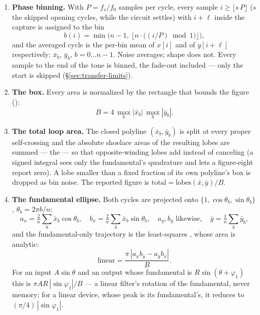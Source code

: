 \documentclass[11pt,a4paper]{article}
\begin{document}
\begin{enumerate}
\item \textbf{Phase binning.} With $P = f_s/f_0$ samples per cycle, every
sample $i \ge \lfloor s\,P \rfloor$ ($s$ the skipped opening cycles, while
the circuit settles) with $i + \ell$ inside the capture is assigned to the
bin
\begin{equation}
  b(i) = \min\!\Big(n - 1,\ \Big\lfloor n\cdot\big((i/P) \bmod 1\big)\Big\rfloor\Big),
  \label{eq:bin}
\end{equation}
and the averaged cycle is the per-bin mean of $x[i]$ and of $y[i + \ell]$
respectively: $\bar x_b$, $\bar y_b$, $b = 0 \ldots n-1$. Noise averages;
shape does not. Every sample to the end of the tone is binned, the fade-out
included --- only the start is skipped (\S\ref{sec:transfer-limits}).

\item \textbf{The box.} Every area is normalized by the rectangle that
bounds the figure ():
\begin{equation}
  B = 4\,\max_b|\bar x_b|\,\max_b|\bar y_b| .
  \label{eq:box}
\end{equation}

\item \textbf{The total loop area.} The closed polyline
$(\bar x_b, \bar y_b)$ is split at every proper self-crossing and the
absolute shoelace areas of the resulting lobes are summed --- the
 --- so that opposite-winding lobes add instead of
canceling (a signed integral sees only the fundamental's quadrature and
lets a figure-eight report zero). A lobe smaller than a fixed fraction of
its own polyline's box is dropped as bin noise. The reported figure is
$\mathrm{total} = \mathrm{lobes}(\bar x, \bar y)/B$.

\item \textbf{The fundamental ellipse.} Both cycles are projected onto
$\{1, \cos\theta_b, \sin\theta_b\}$, $\theta_b = 2\pi b/n$:
\begin{equation}
  a_x = \tfrac{2}{n}\sum_b \bar x_b \cos\theta_b,\quad
  b_x = \tfrac{2}{n}\sum_b \bar x_b \sin\theta_b,\quad
  a_y, b_y \text{ likewise},\quad
  \bar y = \tfrac{1}{n}\sum_b \bar y_b ,
  \label{eq:projection}
\end{equation}
and the fundamental-only trajectory is the least-squares
, whose area is analytic:
\begin{equation}
  \mathrm{linear} = \frac{\pi\,|a_x b_y - a_y b_x|}{B} .
  \label{eq:linear}
\end{equation}
For an input $A\sin\theta$ and an output whose fundamental is
$R\sin(\theta + \varphi_1)$ this is $\pi A R\,|\sin\varphi_1| / B$ --- a
linear filter's rotation of the fundamental, never memory; for a linear
device, whose peak is its fundamental's, it reduces to
$(\pi/4)\,|\sin\varphi_1|$.


\end{enumerate}
\end{document}
